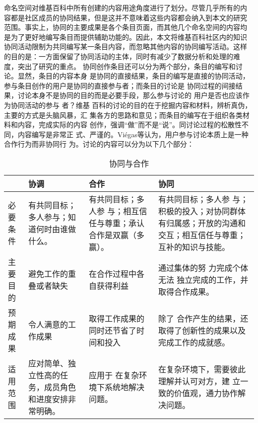 命名空间对维基百科中所有创建的内容用途角度进行了划分。尽管几乎所有的内
容都是社区成员的协同结果，但是这并不意味着这些内容都会纳入到本文的研究
范围。事实上，协同的主要成果是各个条目页面，而其他几个命名空间的内容均
是为了更好地编写条目而提供辅助功能的。因此，本文将维基百科社区内的知识
协同活动限制为共同编写某一条目内容，而忽略其他内容的协同编写活动。这样
的目的是：一方面保留了协同活动的主体，同时有减少了数据分析和处理的难
度，突出了研究的重点。
协同创作条目还可以分为两个部分，条目的编写和讨论。显然，条目的内容本身
是协同的直接结果，条目的编写是直接的协同活动，参与条目创作的用户是协同的直接参与者；而条目的讨论是
协同过程的间接结果，讨论本身不是协同的目的而是必要手段，那么参与讨论的
用户是否也应该作为协同活动的参与
者？维基
百科的讨论的目的在于挖掘内容和材料，辨析真伪，主要的方式是头脑风暴，汇
集各方的思路和意见；而条目的编写在于组织各类材料和内容，完成实际的内容
创作，强调“做”而不是“说”。同讨论过程的松散性不同，内容编写是非常正
式、严谨的。Viégas等认为，用户参与讨论本质上是一种合作行为而非协同行
为。讨论的内容可以分为以下几个部分：

\begin{table}
  \centering
  \caption{协同与合作} 
 \begin{tabularx}{13cm}{|X|X|X|X|}
    \hline
  &协调&合作&协同\\\hline
必要条件&有共同目标；多人参与；知道何时由谁做什么。&有共同目标；多人参
与；相互信任与尊重；承认合作是双赢（多赢）。&有共同目标；多人参
与；积极的投入；对协同群体有归属感；开放的沟通和交互；相互信任与尊重；
互补的知识与技能。\\\hline
主要目的&避免工作的重叠或者缺失&在合作过程中各自获得利益&通过集体的努
力完成个体无法
独立完成的工作，并取得合作成果。\\\hline
预期成果&令人满意的工作成果&取得工作成果的同时还节省了时间和投入&除了
合作产生的结果，还取得了创新性的成果以及完成工作的成就感。\\\hline
适用范围&应对简单、独立性高的任务，成员角色和进度安排非常明确。&应用于
在复杂环境下系统地解决问题。&在复杂环境下，需要彼此理解并认可对方，建
立一致的价值观，通力协作解决问题。\\\hline

  \end{tabularx}
  
  \label{tab:collaboration}
\end{table}


